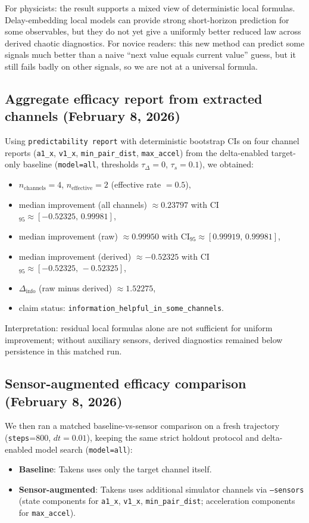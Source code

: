 \documentclass[11pt]{article}
\begin{document}
For physicists: the result supports a mixed view of deterministic local formulas. Delay-embedding local models can provide strong short-horizon prediction for some observables, but they do not yet give a uniformly better reduced law across derived chaotic diagnostics.
For novice readers: this new method can predict some signals much better than a naive ``next value equals current value'' guess, but it still fails badly on other signals, so we are not at a universal formula.

\subsection{Aggregate efficacy report from extracted channels (February 8, 2026)}
Using \texttt{predictability report} with deterministic bootstrap CIs on four channel reports (\texttt{a1\_x}, \texttt{v1\_x}, \texttt{min\_pair\_dist}, \texttt{max\_accel}) from the delta-enabled target-only baseline (\texttt{model=all}, thresholds $\tau_\Delta=0$, $\tau_s=0.1$), we obtained:
\begin{itemize}
\item $n_{\mathrm{channels}}=4$, $n_{\mathrm{effective}}=2$ (effective rate $=0.5$),
\item median improvement (all channels) $\approx 0.23797$ with CI$_{95}\approx[-0.52325,\,0.99981]$,
\item median improvement (raw) $\approx 0.99950$ with CI$_{95}\approx[0.99919,\,0.99981]$,
\item median improvement (derived) $\approx -0.52325$ with CI$_{95}\approx[-0.52325,\,-0.52325]$,
\item $\Delta_{\mathrm{info}}$ (raw minus derived) $\approx 1.52275$,
\item claim status: \texttt{information\_helpful\_in\_some\_channels}.
\end{itemize}

Interpretation: residual local formulas alone are not sufficient for uniform improvement; without auxiliary sensors, derived diagnostics remained below persistence in this matched run.

\subsection{Sensor-augmented efficacy comparison (February 8, 2026)}
We then ran a matched baseline-vs-sensor comparison on a fresh trajectory (\texttt{steps}=800, $dt=0.01$), keeping the same strict holdout protocol and delta-enabled model search (\texttt{model=all}):
\begin{itemize}
\item \textbf{Baseline}: Takens uses only the target channel itself.
\item \textbf{Sensor-augmented}: Takens uses additional simulator channels via \texttt{--sensors} (state components for \texttt{a1\_x}, \texttt{v1\_x}, \texttt{min\_pair\_dist}; acceleration components for \texttt{max\_accel}).
\end{itemize}
\end{document}
